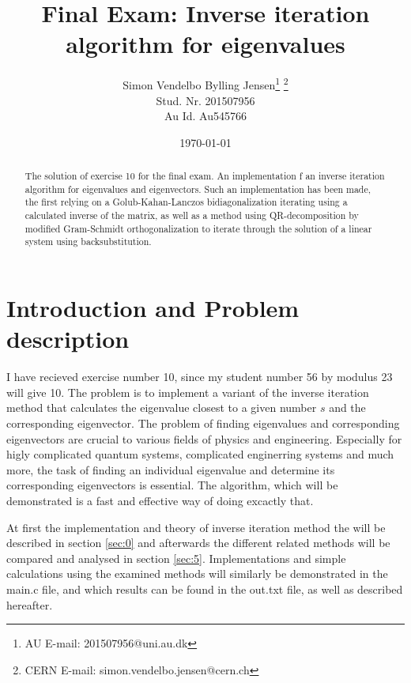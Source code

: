 \documentclass[twocolumn]{article}
\begin{document}
\title{Final Exam: Inverse iteration algorithm for eigenvalues}
\author{Simon Vendelbo Bylling Jensen\thanks{AU E-mail: 201507956@uni.au.dk} \thanks{CERN E-mail: simon.vendelbo.jensen@cern.ch}\\
Stud. Nr. 201507956 \\
Au Id. Au545766}
\date{\today}
\maketitle

\begin{abstract}
The  solution of exercise 10 for the final exam. An implementation f an inverse iteration algorithm for eigenvalues and eigenvectors. Such an implementation has been made, the first relying on a Golub-Kahan-Lanczos bidiagonalization iterating using a calculated inverse of the matrix, as well as a method using QR-decomposition by modified Gram-Schmidt orthogonalization to iterate through the solution of a linear system using backsubstitution. 
\end{abstract}

\section*{Introduction and Problem description}
I have recieved exercise number 10, since my student number 56 by modulus 23 will give 10. The problem is to implement a variant of the inverse iteration method that calculates the eigenvalue closest to a given number $s$ and the corresponding eigenvector. The problem of finding eigenvalues and corresponding eigenvectors are crucial to various fields of physics and engineering. Especially for higly complicated quantum systems, complicated enginerring systems and much more, the task of finding an individual eigenvalue and determine its corresponding eigenvectors is essential. The algorithm, which will be demonstrated is a fast and effective way of doing excactly that. 

At first the implementation and theory of inverse iteration method the will be described in section \ref{sec:0} and afterwards the different related methods will be compared and analysed in section \ref{sec:5}. Implementations and simple calculations using the examined methods will similarly be demonstrated in the main.c file, and which results can be found in the out.txt file, as well as described hereafter. 
\end{document}
